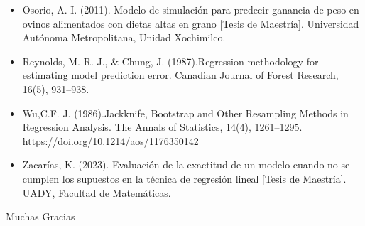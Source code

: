 \documentclass[serif, aspectratio=169]{beamer}
\begin{document}
\begin{frame}
\begin{itemize}
	\item Osorio, A. I. (2011). Modelo de simulación para predecir ganancia de peso en ovinos alimentados con dietas altas en grano [Tesis de Maestría]. Universidad Autónoma Metropolitana, Unidad Xochimilco.
	
	\item 	 Reynolds, M. R. J., \& Chung, J. (1987).Regression methodology for estimating model prediction error. Canadian Journal of Forest Research, 16(5), 931–938.
	
	\item 	Wu,C.F. J. (1986).Jackknife, Bootstrap and Other Resampling Methods in Regression
	Analysis. The Annals of Statistics, 14(4), 1261–1295. https://doi.org/10.1214/aos/1176350142
	
	\item 	Zacarías, K. (2023). Evaluación de la exactitud de un modelo cuando no se cumplen los supuestos en la técnica de regresión lineal [Tesis de Maestría]. UADY, Facultad de Matemáticas.
\end{itemize}
	
\end{frame}



\begin{frame}
    \begin{center}
        {\Huge \calligra Muchas Gracias}
    \end{center}
\end{frame}
\end{document}
